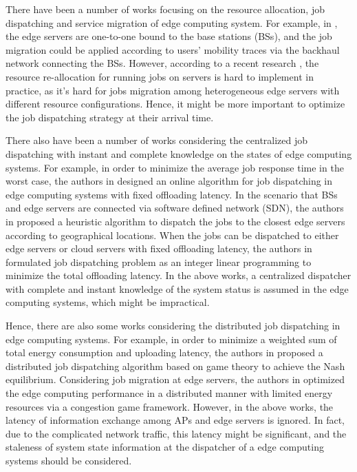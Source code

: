 There have been a number of works focusing on the resource allocation, job dispatching and service migration of edge computing system.
For example, in \cite{TON19-WangSq}, the edge servers are one-to-one bound to the base stations (BSs), and the job migration could be applied according to users' mobility traces via the backhaul network connecting the BSs.
However, according to a recent research \cite{INFOCOM19-WuC}, the resource re-allocation for running jobs on servers is hard to implement in practice, as it's hard for jobs migration among heterogeneous edge servers with different resource configurations.
Hence, it might be more important to optimize the job dispatching strategy at their arrival time.

There also have been a number of works considering the centralized job dispatching with instant and complete knowledge on the states of edge computing systems. For example, in order to minimize the average job response time in the worst case, the authors in \cite{tan-online} designed an online algorithm for job dispatching in edge computing systems with fixed offloading latency. In the scenario that BSs and edge servers are connected via software defined network (SDN), the authors in \cite{IOTJ18-FanQ} proposed a heuristic algorithm to dispatch the jobs to the closest edge servers according to geographical locations. When the jobs can be dispatched to either edge servers or cloud servers with fixed offloading latency, the authors in \cite{MASS18-MengZ} formulated job dispatching problem as an integer linear programming to minimize the total offloading latency.
In the above works, a centralized dispatcher with complete and instant knowledge of the system status is assumed in the edge computing systems, which might be impractical.

Hence, there are also some works considering the distributed job dispatching in edge computing systems. For example, in order to minimize a weighted sum of total energy consumption and uploading latency, the authors in \cite{ToN-Xuchen2016} proposed a distributed job dispatching algorithm based on game theory to achieve the Nash equilibrium. 
Considering job migration at edge servers, the authors in \cite{ToN-xujie2018} optimized the edge computing performance in a distributed manner with limited energy resources via a congestion game framework.
However, in the above works, the latency of information exchange among APs and edge servers is ignored.
In fact, due to the complicated network traffic, this latency might be significant, and the staleness of system state information at the dispatcher of a edge computing systems should be considered.

